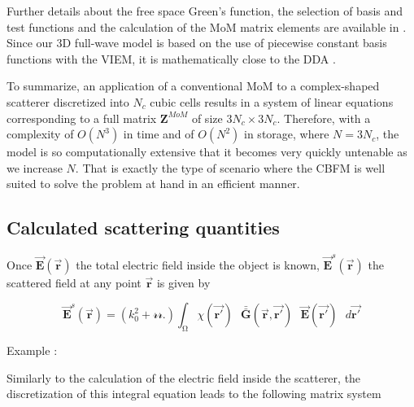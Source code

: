 \documentclass{article}
\begin{document}
Further details about the free space Green's function, the selection of basis and test functions and the calculation of the MoM matrix elements are available in \cite{Nguyen2006model,Bellez2009model}.
Since our 3D full-wave model is based on the use of piecewise constant basis functions with the VIEM, it is mathematically close to the DDA \cite{penttila2007comparison}.     

To summarize, an application of a conventional MoM to a complex-shaped scatterer discretized into $N_c$ cubic cells results in a system of linear equations corresponding to a full matrix $\textbf{Z}^{MoM}$ of size $3N_c\times3N_c$. Therefore, with a complexity of $O(N^3)$ in time and of $O(N^2)$ in storage, where $N=3N_c$,  the model is so computationally extensive that it becomes very quickly untenable as we increase $N$. That is exactly the type of scenario where the CBFM is well suited to solve the problem at hand in an efficient manner. 



\subsection{Calculated scattering quantities} \label{Scattering_Quantities}
Once $\vec{\textbf{E}}(\vec{\textbf{r}})$ the total electric field inside the object is known, $\vec{\textbf{E}}^s(\vec{\textbf{r}})$ the scattered field at any point $\vec{\textbf{r}}$ is given by    

\begin{equation}
\label{EQ_VIEM_scat}
\vec{\textbf{E}}^s(\vec{\textbf{r}})= (k_0^2 + \mathcal{r}\mathcal{r}.) \mathrm{\int_{\Omega}} \chi(\vec{\textbf{r}'})\text{ }\bar{\bar{\textbf{G}}}(\vec{\textbf{r}},\vec{\textbf{r}'})\text{ }\vec{\textbf{E}}(\vec{\textbf{r}'}) \text{ }d\vec{\textbf{r}'}
\end{equation}

Example : 


Similarly to the calculation of the electric field inside the scatterer, the discretization of this integral equation leads to the following matrix system 
\end{document}
